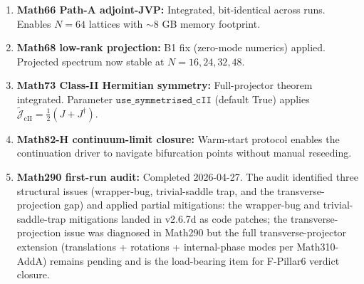\begin{enumerate}
\item \textbf{Math66 Path-A adjoint-JVP:} Integrated, bit-identical across
runs. Enables $N=64$ lattices with $\sim 8$ GB memory footprint.

\item \textbf{Math68 low-rank projection:} B1 fix (zero-mode numerics)
applied. Projected spectrum now stable at $N=16, 24, 32, 48$.

\item \textbf{Math73 Class-II Hermitian symmetry:} Full-projector theorem
integrated. Parameter $\texttt{use\_symmetrised\_cII}$ (default True)
applies $\widetilde{\mathcal{J}}_{\text{cII}} = \frac{1}{2}(J + J^\dagger)$.

\item \textbf{Math82-H continuum-limit closure:} Warm-start protocol
enables the continuation driver to navigate bifurcation points without
manual reseeding.

\item \textbf{Math290 first-run audit:} Completed 2026-04-27. The
audit identified three structural issues (wrapper-bug, trivial-saddle
trap, and the transverse-projection gap) and applied partial
mitigations: the wrapper-bug and trivial-saddle-trap mitigations
landed in v2.6.7d as code patches; the transverse-projection issue
was diagnosed in Math290 but the full transverse-projector extension
(translations + rotations + internal-phase modes per Math310-AddA)
remains pending and is the load-bearing item for F-Pillar6 verdict
closure.


\end{enumerate}
